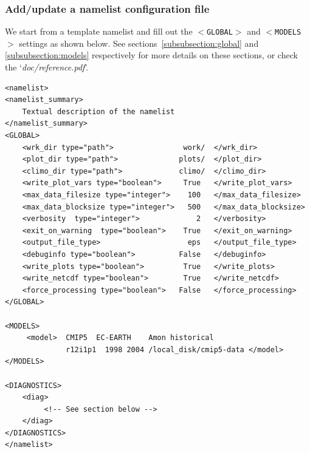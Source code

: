 \documentclass[12pt]{article}
\newcommand{\docref}[1]{`\emph{#1}'}
\newcommand{\xmltag}[1]{\texttt{$<$#1$>$}}
\begin{document}
\subsubsection{Add/update a namelist configuration file}\label{subsubsection:namelistcfg-file}
We start from a template namelist and fill out the \xmltag{GLOBAL} and
\xmltag{MODELS} settings as shown below. See
sections~\ref{subsubsection:global} and \ref{subsubsection:models}
respectively for more details on these sections, or check the
\docref{doc/reference.pdf}.
\begin{Verbatim}[frame=single, fontsize=\footnotesize]
<namelist>
<namelist_summary>
    Textual description of the namelist
</namelist_summary>
<GLOBAL>
    <wrk_dir type="path">                work/  </wrk_dir>
    <plot_dir type="path">              plots/  </plot_dir>
    <climo_dir type="path">             climo/  </climo_dir>
    <write_plot_vars type="boolean">     True   </write_plot_vars>
    <max_data_filesize type="integer">    100   </max_data_filesize>
    <max_data_blocksize type="integer">   500   </max_data_blocksize>
    <verbosity  type="integer">             2   </verbosity>
    <exit_on_warning  type="boolean">    True   </exit_on_warning>
    <output_file_type>                    eps   </output_file_type>
    <debuginfo type="boolean">          False   </debuginfo>
    <write_plots type="boolean">         True   </write_plots>
    <write_netcdf type="boolean">        True   </write_netcdf>
    <force_processing type="boolean">   False   </force_processing>
</GLOBAL>

<MODELS>
     <model>  CMIP5  EC-EARTH    Amon historical 
              r12i1p1  1998 2004 /local_disk/cmip5-data </model>
</MODELS>

<DIAGNOSTICS>
    <diag>
         <!-- See section below -->
    </diag>
</DIAGNOSTICS>
</namelist>
\end{Verbatim}

\end{document}
